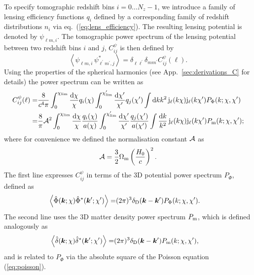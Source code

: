\documentclass[useAMS,usenatbib]{mn2e} %
\newcommand{\pref}{{\cal A}}
\renewcommand{\vec}{\bm}
\begin{document}
To specify tomographic redshift bins $i=0\ldots N_z-1$, we introduce a family
of lensing efficiency functions $q_i$ defined by a corresponding family of
redshift distributions $n_i$ via eq.~(\ref{eq:lens_efficiency}). The resulting
lensing potential is denoted by $\psi_{\ell m, i}$. The tomographic power
spectrum of the lensing potential between two redshift bins $i$ and $j$,
$C_{ij}^\psi$ is then defined by \cite{pee80}
%
\begin{equation}
  \left\langle \psi^{}_{\ell m, i} \, \psi^\ast_{\ell^\prime m^\prime, j} \right\rangle
    = \delta_{\ell \ell^\prime} \delta_{m m^\prime} C^\psi_{ij}(\ell) .
  \label{eq:C_ell_psi}
\end{equation}
%
Using the properties of the spherical harmonics (see
App.~\ref{sec:derivations_C} for details) the power spectrum can be written as
%
\begin{align}
  C_{ij}^\psi(\ell) = & \frac 8 {c^4 \pi} 
  \int_0^{\chi_{\rm lim}} \frac{{\rm d}\chi}{\chi} q_i(\chi)
  \int_0^{\chi^\prime_{\rm lim}} \frac{{\rm d}\chi^\prime}{\chi^\prime} q_j(\chi^\prime)
  \int {\rm d} k k^2 \, {\rm j}_\ell(k \chi) {\rm j}_\ell(k \chi^\prime) P_\Phi(k; \chi, \chi^\prime)
  \label{eq:C_ell_phi_Pphi} \\
  = & \frac 8 \pi \pref^2
  \int_0^{\chi_{\rm lim}} \frac{{\rm d}\chi}{\chi} \frac{q_i(\chi)}{a(\chi)}
  \int_0^{\chi^\prime_{\rm lim}} \frac{{\rm d}\chi^\prime}{\chi^\prime} \frac{q_j(\chi^\prime)}{a(\chi^\prime)}
  \int \frac{{\rm d} k}{k^2} \, {\rm j}_\ell(k \chi) {\rm j}_\ell(k \chi^\prime) P_{\rm m}(k; \chi, \chi^\prime) ;
  \label{eq:C_ell_phi_Pm}
\end{align}
%
where for convenience we defined the normalisation constant $\pref$ as
%
\begin{equation}
  \pref = \frac 3 2 \Omega_{\rm m} \left(\frac{H_0} c\right)^2.
  \label{eq:pref}
\end{equation}
%
The first line expresses $C_{ij}^\psi$ in terms of the 3D potential power spectrum $P_\Phi$, defined as
%
\begin{align}
  \left\langle \hat \Phi(\vec k; \chi) \hat \Phi^\ast(\vec k^\prime; \chi^\prime) \right\rangle
    = & (2\pi)^3 \delta_{\rm D}(\vec k - \vec k^\prime) P_\Phi(k; \chi, \chi^\prime).
  \label{eq:p_phi}
\end{align}
%
The second line uses the 3D matter density power spectrum $P_{\rm m}$, which is defined analogously as
%
\begin{align}
  \left\langle \hat \delta(\vec k; \chi) \hat \delta^\ast(\vec k^\prime; \chi^\prime) \right\rangle
    = & (2\pi)^3 \delta_{\rm D}(\vec k - \vec k^\prime) P_{\rm m}(k; \chi, \chi^\prime),
  \label{eq:p_m}
\end{align}
%
and is
related to $P_\Phi$ via the absolute square of the Poisson equation (\ref{eq:poisson}).
\end{document}

